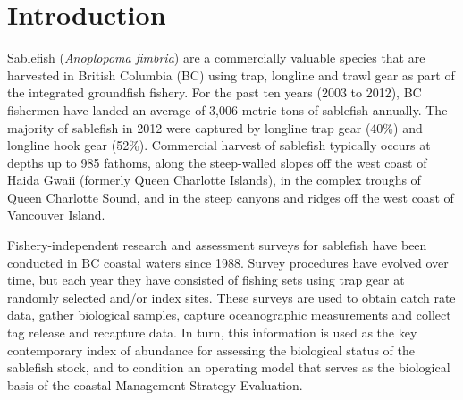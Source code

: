 \documentclass[12pt]{article}\usepackage[]{graphicx}\usepackage[]{color}
\begin{document}

\frontmatter


\renewcommand{\headrulewidth}{0.5pt}  %
\renewcommand{\footrulewidth}{0.5pt}  %

\hypertarget{introduction}{%
\section{Introduction}\label{introduction}}

Sablefish (\emph{Anoplopoma fimbria}) are a commercially valuable species that are harvested in British Columbia (BC) using trap, longline and trawl gear as part of the integrated groundfish fishery. For the past ten years (2003 to 2012), BC fishermen have landed an average of 3,006 metric tons of sablefish annually. The majority of sablefish in 2012 were captured by longline trap gear (40\%) and longline hook gear (52\%). Commercial harvest of sablefish typically occurs at depths up to 985 fathoms, along the steep-walled slopes off the west coast of Haida Gwaii (formerly Queen Charlotte Islands), in the complex troughs of Queen Charlotte Sound, and in the steep canyons and ridges off the west coast of Vancouver Island.

Fishery-independent research and assessment surveys for sablefish have been conducted in BC coastal waters since 1988. Survey procedures have evolved over time, but each year they have consisted of fishing sets using trap gear at randomly selected and/or index sites. These surveys are used to obtain catch rate data, gather biological samples, capture oceanographic measurements and collect tag release and recapture data. In turn, this information is used as the key contemporary index of abundance for assessing the biological status of the sablefish stock, and to condition an operating model that serves as the biological basis of the coastal Management Strategy Evaluation.
\end{document}
